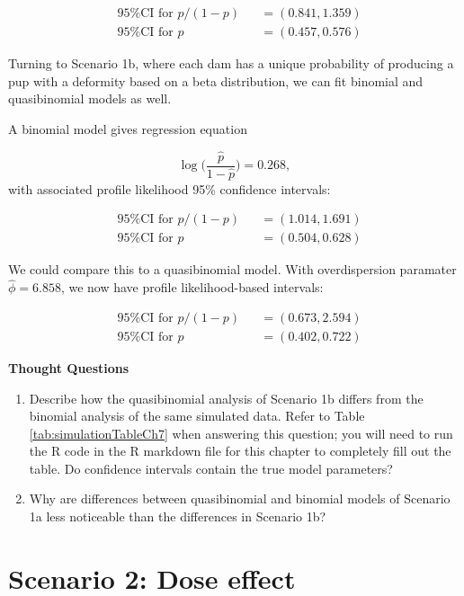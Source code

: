 \documentclass[
]{krantz}
\begin{document}
\[
\begin{alignedat}{2}
  &\textrm{95\% CI for } p/(1-p) &&= (0.841, 1.359) \\
  &\textrm{95\% CI for } p       &&= (0.457, 0.576)
\end{alignedat}
\]

Turning to Scenario 1b, where each dam has a unique probability of producing a pup with a deformity based on a beta distribution, we can fit binomial and quasibinomial models as well.

A binomial model gives regression equation

\begin{equation*}
  \log\bigg(\frac{\hat{p}}{1-\hat{p}}\bigg) = 0.268,
\end{equation*}
with associated profile likelihood 95\% confidence intervals:

\[
\begin{alignedat}{2}
  &\textrm{95\% CI for } p/(1-p) &&= (1.014, 1.691) \\
  &\textrm{95\% CI for } p       &&= (0.504, 0.628)
\end{alignedat}
\]

We could compare this to a quasibinomial model. With overdispersion paramater \(\widehat{\phi} = 6.858\), we now have profile likelihood-based intervals:

\[
\begin{alignedat}{2}
  &\textrm{95\% CI for } p/(1-p) &&= (0.673, 2.594) \\
  &\textrm{95\% CI for } p       &&= (0.402, 0.722)
\end{alignedat}
\]

\textbf{Thought Questions}

\begin{enumerate}
\def\labelenumi{\arabic{enumi}.}
\setcounter{enumi}{3}
\item
  Describe how the quasibinomial analysis of Scenario 1b differs from the binomial analysis of the same simulated data. Refer to Table \ref{tab:simulationTableCh7} when answering this question; you will need to run the R code in the R markdown file for this chapter to completely fill out the table. Do confidence intervals contain the true model parameters?
\item
  Why are differences between quasibinomial and binomial models of Scenario 1a less noticeable than the differences in Scenario 1b?
\end{enumerate}

\hypertarget{scenario-2-dose-effect}{%
\section{Scenario 2: Dose effect}\label{scenario-2-dose-effect}}
\end{document}
